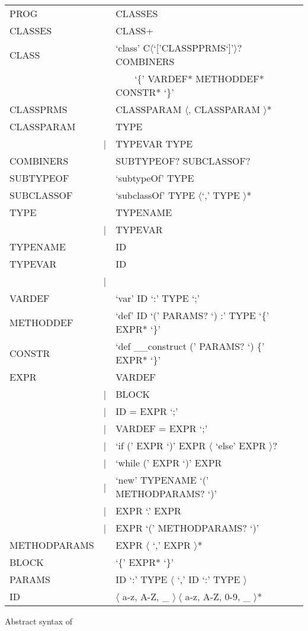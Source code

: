 \begin{listing}
	\begin{tabular}[H]{lrll}
		PROG & \lra & CLASSES \\
		CLASSES & \lra & CLASS+ \\
		CLASS & \lra & `class' C$\langle$`['CLASSPPRMS`]'$\rangle$? COMBINERS \\
		& & ~~~~`\{' VARDEF* METHODDEF* CONSTR* `\}' \\
		CLASSPRMS & \lra & CLASSPARAM $\langle$, CLASSPARAM $\rangle$* \\
		CLASSPARAM & \lra & TYPE \\
		 & | & TYPEVAR \match TYPE \\
		COMBINERS & \lra & SUBTYPEOF? SUBCLASSOF? \\
		SUBTYPEOF & \lra & `subtypeOf' TYPE \\
		SUBCLASSOF & \lra & `subclassOf' TYPE $\langle$`,' TYPE $\rangle$* \\
		TYPE & \lra & TYPENAME \\
		& | & TYPEVAR \\
		TYPENAME & \lra & ID \\
		TYPEVAR & \lra & ID \\
		& | & \mytype \\
		VARDEF & \lra & `var' ID `:' TYPE `;' \\
		METHODDEF & \lra & `def' ID `(' PARAMS? `) :' TYPE `\{' EXPR* `\}'  \\
		CONSTR & \lra & `def \_\_construct (' PARAMS? `) \{' EXPR* `\}' \\
		EXPR & \lra & VARDEF \\
		& | & BLOCK \\
		& | & ID = EXPR `;' \\
		& | & VARDEF = EXPR `;' \\
		& | & `if (' EXPR `)' EXPR $\langle$ `else' EXPR $\rangle$?  \\
		& | & `while (' EXPR `)' EXPR \\
		& | & `new' TYPENAME `(' METHODPARAMS? `)' \\
		& | & EXPR `.' EXPR \\
		& | & EXPR `(' METHODPARAMS? `)' \\
		METHODPARAMS & \lra & EXPR $\langle$ `,' EXPR $\rangle$* \\
		BLOCK & \lra & `\{' EXPR* `\}' \\
		PARAMS & \lra & ID `:' TYPE $\langle$ `,' ID `:' TYPE $\rangle$ \\
		ID & \lra & $\langle$ a-z, A-Z, \_ $\rangle~\langle$ a-z, A-Z, 0-9, \_ $\rangle$*
	\end{tabular}
	\caption{Abstract syntax of \ooplss}
	\label{lst:abstractSyntax}
\end{listing}

